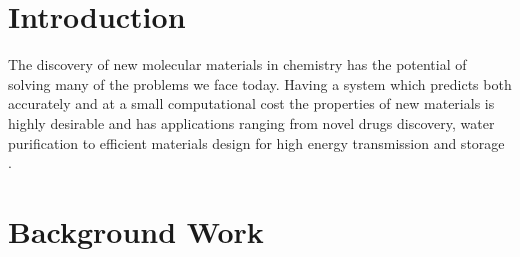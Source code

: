 \documentclass[10pt,journal,a4paper]{IEEEtran}
\begin{document}
\IEEEpeerreviewmaketitle


\section{Introduction}

The discovery of new molecular materials in chemistry has the potential of solving many of the problems we face today.
Having a system which predicts both accurately and at a small computational cost the properties of new materials is highly desirable and has applications ranging from novel drugs discovery, water purification to efficient materials design for high energy transmission and storage \cite{cleanenergy}.
 
\section{Background Work}


%
%
\end{document}
